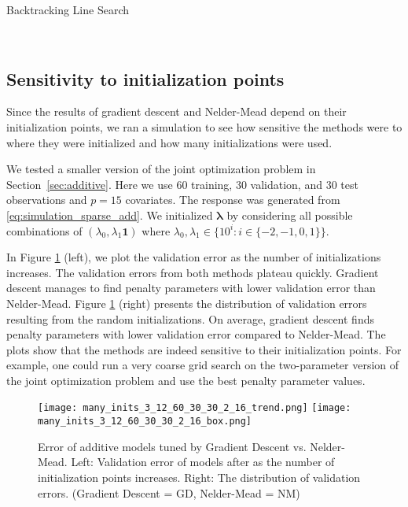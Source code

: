 \documentclass[12pt,letterpaper]{article}
\begin{document}
\begin{algorithm}
\caption{Backtracking Line Search}
\label{alg:backtracking}
         \begin{algorithmic}
  	 \\
	\ENDWHILE
	\end{algorithmic}
\end{algorithm}

\subsection{Sensitivity to initialization points}
Since the results of gradient descent and Nelder-Mead depend on their initialization points, we ran a simulation to see how sensitive the methods were to where they were initialized and how many initializations were used.

We tested a smaller version of the joint optimization problem in  Section~\ref{sec:additive}. Here we use 60 training, 30 validation, and 30 test observations and $p = 15$ covariates. The response was generated from \eqref{eq:simulation_sparse_add}. We initialized $\boldsymbol{\lambda}$ by considering all possible combinations of $(\lambda_0, \lambda_1 \boldsymbol{1})$ where $\lambda_0, \lambda_1 \in \{10^i: i\in\{-2, -1, 0, 1\}\}$.

In Figure \ref{fig:mult_starts} (left), we plot the validation error as the number of initializations increases. The validation errors from both methods plateau quickly. Gradient descent manages to find penalty parameters with lower validation error than Nelder-Mead. Figure \ref{fig:mult_starts} (right) presents the distribution of validation errors resulting from the random initializations. On average, gradient descent finds penalty parameters with lower validation error compared to Nelder-Mead. The plots show that the methods are indeed sensitive to their initialization points. For example, one could run a very coarse grid search on the two-parameter version of the joint optimization problem and use the best penalty parameter values.

\begin{figure}
	\caption{\label{fig:mult_starts}
		Error of additive models tuned by Gradient Descent vs. Nelder-Mead. Left: Validation error of models after as the number of initialization points increases. Right: The distribution of validation errors. (Gradient Descent = GD, Nelder-Mead = NM)
	}
	\centering
	\texttt{[image: many\_inits\_3\_12\_60\_30\_30\_2\_16\_trend.png]}
	\texttt{[image: many\_inits\_3\_12\_60\_30\_30\_2\_16\_box.png]}
\end{figure}
\end{document}

